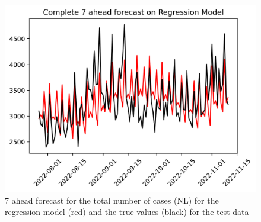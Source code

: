 \begin{figure}
\begin{minipage}{.32\textwidth}
  \label{fig:tot_cases_fc_7_LLM_DE}
\end{minipage}
\begin{minipage}{.32\textwidth}
  \centering
  \includegraphics[width=\linewidth]{pics/7_ah/Complete_7_ahead_Regression Model.png}
  \caption{7 ahead forecast for the total number of cases (NL) for the regression model (red) and the true values (black) for the test data}
  \label{fig:tot_cases_fc_7_RM}
\end{minipage}

\end{figure}
